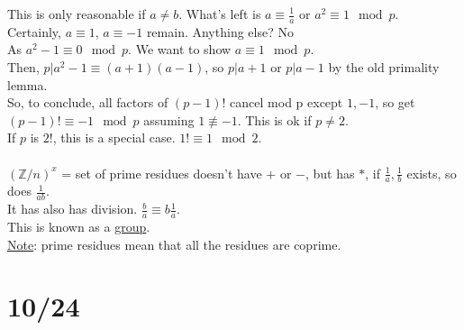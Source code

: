 \documentclass[13pt]{article}
\begin{document}
	This is only reasonable if $a \not= b$. What's left is $a \equiv 
	\frac{1}{a}$ or $a^2 \equiv 1 \mod p$.\\
	Certainly, $a \equiv 1$, $a \equiv -1$ remain. Anything else? No\\
	As $a^2 - 1 \equiv 0 \mod p$. We want to show $a \equiv 1 \mod p$.\\
	Then, $p | a^2 - 1 \equiv (a+1)(a-1)$, so $p | a+1$ or $p | a -1$ by 
	the old primality lemma.\\
	So, to conclude, all factors of $(p-1)!$ cancel mod p except $1,-1$,
	so get $(p-1)! \equiv -1 \mod p$ assuming $1 \not\equiv -1$. This is ok
	if $p \not= 2$. \\
	If $p$ is $2!$, this is a special case. $1! \equiv 1 \mod 2$.\\\\
	$(\mathbb{Z}/n)^x$ = set of prime residues doesn't have $+$ or $-$, but
	has $*$, if $\frac{1}{a}, \frac{1}{b}$ exists, so does $\frac{1}{ab}$.\\
	It has also has division. $\frac{b}{a} \equiv b\frac{1}{a}$.\\
	This is known as a \underline{group}.\\
	\underline{Note}: prime residues mean that all the residues are coprime.

\section*{10/24}
\end{document}
